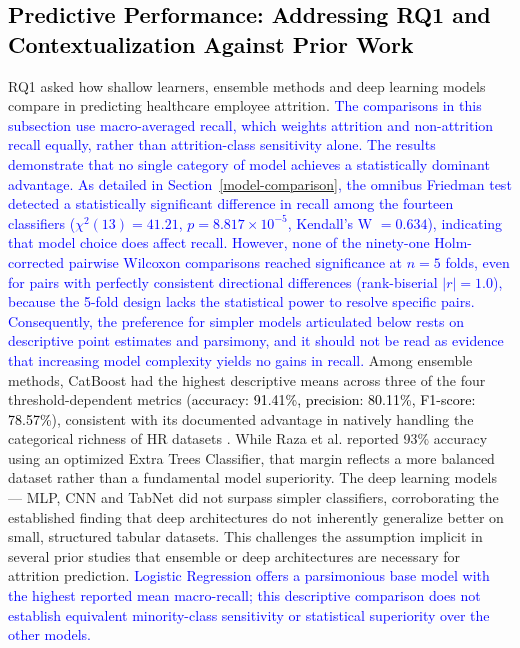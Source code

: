\documentclass[a4paper,fleqn]{cas-sc}
\begin{document}
\subsection{\textcolor{black}{Predictive Performance: Addressing RQ1 and Contextualization Against Prior Work}}
RQ1 asked how shallow learners, ensemble methods and deep learning models compare in predicting healthcare employee attrition. \textcolor{blue}{The comparisons in this subsection use macro-averaged recall, which weights attrition and non-attrition recall equally, rather than attrition-class sensitivity alone. The results demonstrate that no single category of model achieves a statistically dominant advantage. As detailed in Section~\ref{model-comparison}, the omnibus Friedman test detected a statistically significant difference in recall among the fourteen classifiers ($\chi^2(13) = 41.21$, $p = 8.817\times10^{-5}$, Kendall's W $= 0.634$), indicating that model choice does affect recall. However, none of the ninety-one Holm-corrected pairwise Wilcoxon comparisons reached significance at $n = 5$ folds, even for pairs with perfectly consistent directional differences (rank-biserial $|r| = 1.0$), because the 5-fold design lacks the statistical power to resolve specific pairs. Consequently, the preference for simpler models articulated below rests on descriptive point estimates and parsimony, and it should not be read as evidence that increasing model complexity yields no gains in recall.}
Among ensemble methods, CatBoost had the highest descriptive means across three of the four threshold-dependent metrics (\textcolor{black}{accuracy: 91.41\%, precision: 80.11\%, F1-score: 78.57\%}), consistent with its documented advantage in natively handling the categorical richness of HR datasets \cite{prokhorenkova2018catboost}. While Raza et al. \cite{app12136424} reported 93\% accuracy using an optimized Extra Trees Classifier, that margin reflects a more balanced dataset rather than a fundamental model superiority. The deep learning models — MLP, CNN and TabNet did not surpass simpler classifiers, corroborating the established finding that deep architectures do not inherently generalize better on small, structured tabular datasets. This challenges the assumption implicit in several prior studies \cite{app12136424, Akasheh2024} that ensemble or deep architectures are necessary for attrition prediction. \textcolor{blue}{Logistic Regression offers a parsimonious base model with the highest reported mean macro-recall; this descriptive comparison does not establish equivalent minority-class sensitivity or statistical superiority over the other models.}
\end{document}
